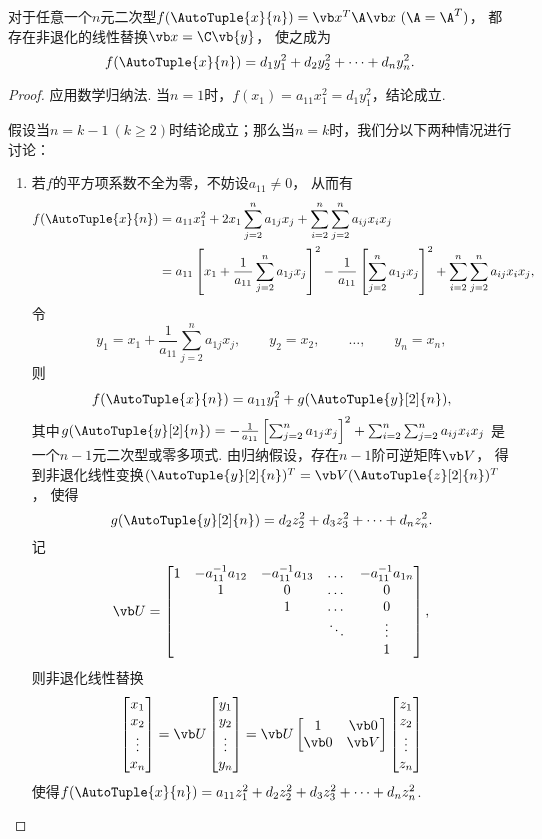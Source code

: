 \begin{theorem}
对于任意一个\(n\)元二次型\(f(\AutoTuple{x}{n})=\x^T\A\x\ (\A=\A^T)\)，
都存在非退化的线性替换\(\x=\C\vb{y}\)，
使之成为\[
	f(\AutoTuple{x}{n})=d_1 y_1^2 + d_2 y_2^2 + \dotsb + d_n y_n^2.
\]
\begin{proof}
应用数学归纳法.
当\(n=1\)时，\(f(x_1) = a_{11} x_1^2 = d_1 y_1^2\)，结论成立.

假设当\(n=k-1\ (k\geq2)\)时结论成立；那么当\(n=k\)时，我们分以下两种情况进行讨论：
\begin{enumerate}
\item 若\(f\)的平方项系数不全为零，不妨设\(a_{11}\neq0\)，
从而有\begin{align*}
	f(\AutoTuple{x}{n})
	&= a_{11} x_1^2 + 2 x_1 \sum_{j=2}^n a_{1j} x_j
		+ \sum_{i=2}^n \sum_{j=2}^n a_{ij} x_i x_j \\
	&= a_{11} \left[
		x_1 + \frac{1}{a_{11}} \sum_{j=2}^n a_{1j} x_j
	\right]^2
	- \frac{1}{a_{11}} \left[
		\sum_{j=2}^n a_{1j} x_j
	\right]^2
	+ \sum_{i=2}^n \sum_{j=2}^n a_{ij} x_i x_j,
\end{align*}
令\[
	y_1 = x_1 + \frac{1}{a_{11}} \sum_{j=2}^n a_{1j} x_j, \qquad
	y_2 = x_2, \qquad
	\dotsc, \qquad
	y_n = x_n,
\]
则\[
	f(\AutoTuple{x}{n}) = a_{11} y_1^2 + g(\AutoTuple{y}[2]{n}),
\]
其中\(g(\AutoTuple{y}[2]{n})
= - \frac{1}{a_{11}} \left[
	\sum_{j=2}^n a_{1j} x_j
\right]^2
+ \sum_{i=2}^n \sum_{j=2}^n a_{ij} x_i x_j\)%
是一个\(n-1\)元二次型或零多项式.
由归纳假设，存在\(n-1\)阶可逆矩阵\(\Q\)，
得到非退化线性变换\((\AutoTuple{y}[2]{n})^T = \Q (\AutoTuple{z}[2]{n})^T\)，
使得\[
	g(\AutoTuple{y}[2]{n})
	= d_2 z_2^2 + d_3 z_3^2 + \dotsb + d_n z_n^2.
\]
记\[
	\P = \begin{bmatrix}
		1 & -a_{11}^{-1} a_{12} & -a_{11}^{-1} a_{13} & \dots & -a_{11}^{-1} a_{1n} \\
		& 1 & 0 & \dots & 0 \\
		& & 1 & \dots & 0 \\
		& & & \ddots & \vdots \\
		& & & & 1
	\end{bmatrix},
\]则非退化线性替换\[
	\begin{bmatrix}
		x_1 \\ x_2 \\ \vdots \\ x_n
	\end{bmatrix}
	= \P \begin{bmatrix}
		y_1 \\ y_2 \\ \vdots \\ y_n
	\end{bmatrix}
	= \P \begin{bmatrix} 1 & \vb0 \\ \vb0 & \Q \end{bmatrix} \begin{bmatrix}
		z_1 \\ z_2 \\ \vdots \\ z_n
	\end{bmatrix}
\]
使得\(f(\AutoTuple{x}{n}) = a_{11} z_1^2 + d_2 z_2^2 + d_3 z_3^2 + \dotsb + d_n z_n^2\).


\end{enumerate}
\end{proof}
\end{theorem}
